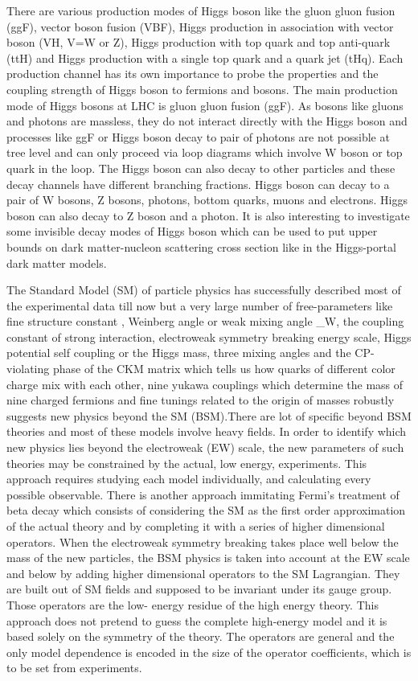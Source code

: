 \documentclass[final,3p]{CSP}
\begin{document}
There are various production modes of Higgs boson like the gluon gluon fusion (ggF), vector boson fusion (VBF), Higgs production 
in association with vector boson (VH, V=W or Z), Higgs production with top quark and top anti-quark (ttH) and Higgs production with 
a single top quark and a quark jet (tHq). Each production channel has its own importance to probe the properties and the coupling 
strength of Higgs boson to fermions and bosons. The main production mode of Higgs bosons at LHC is gluon gluon fusion (ggF). As 
bosons like gluons and photons are massless, they do not interact directly with the Higgs boson and processes like ggF or Higgs 
boson decay to pair of photons are not possible at tree level and can only proceed via loop diagrams which involve W boson or top 
quark in the loop. The Higgs boson can also decay to other particles and these decay channels have different branching fractions. 
Higgs boson can decay to a pair of W bosons, Z bosons, photons, bottom quarks, muons and electrons. Higgs boson can also decay to 
Z boson and a photon. It is also interesting to investigate some invisible decay modes of Higgs boson which can be used to put 
upper bounds on dark matter-nucleon scattering cross section like in the Higgs-portal dark matter models. 

The Standard Model (SM) of particle physics has successfully described most of the experimental data till now but a very large number of
free-parameters like fine structure constant \alpha, Weinberg angle or weak mixing angle \theta_W, the coupling constant of strong 
interaction, electroweak symmetry breaking energy scale, Higgs potential self coupling or the Higgs mass, three mixing angles and the 
CP-violating phase of the CKM matrix which tells us how quarks of different color charge mix with each other, nine yukawa couplings 
which determine the mass of nine charged fermions and fine tunings related to the origin of masses robustly suggests new physics beyond 
the SM (BSM).There are lot of specific beyond BSM theories and most of these models involve heavy fields. In order to identify which new 
physics lies beyond the electroweak (EW) scale, the new parameters of such theories may be constrained by the actual, low energy, 
experiments. This approach requires studying each model individually, and calculating every possible observable. There is another 
approach immitating Fermi’s treatment of beta decay which consists of considering the SM as the first order approximation of the actual 
theory and by completing it with a series of higher dimensional operators. When the electroweak symmetry breaking takes place well below 
the mass of the new particles, the BSM physics is taken into account at the EW scale and below by adding higher dimensional operators to 
the SM Lagrangian. They are built out of SM fields and supposed to be invariant under its gauge group. Those operators are the low-
energy residue of the high energy theory. This approach does not pretend to guess the complete high-energy model and it is based solely 
on the symmetry of the  theory. The operators are general and the only model dependence is encoded in the size of the operator 
coefficients, which is to be set from experiments. 
\end{document}
